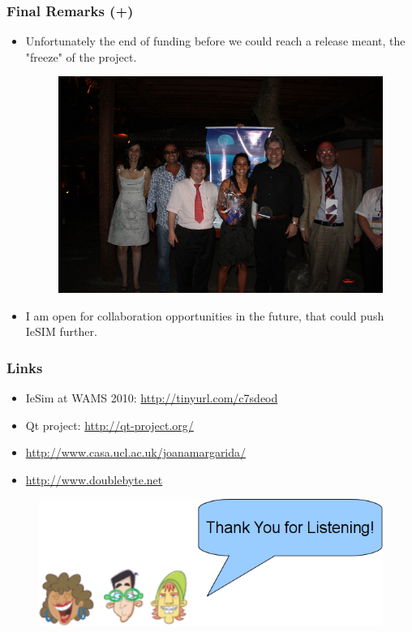 \documentclass[hyperref={pdfpagelabels=true}]{beamer}
\begin{document}
\begin{frame}
\frametitle{Final Remarks (+)}
\begin{itemize}
\item Unfortunately the end of funding before we could reach a release meant, the "freeze" of the project. %
\begin{figure}
\includegraphics[scale=0.25]{award.jpg}
\end{figure}
\item I am open for collaboration opportunities in the future, that could push IeSIM further.
\end{itemize}
\end{frame}

\begin{frame}
\frametitle{Links}
\begin{itemize}
\item IeSim at WAMS 2010: \url{http://tinyurl.com/c7sdeod}
\item Qt project: \url{http://qt-project.org/}
\item \url{http://www.casa.ucl.ac.uk/joanamargarida/}
\item \url{http://www.doublebyte.net}
\end{itemize}
\begin{figure}
\includegraphics[scale=0.4]{thanks.png}
\end{figure}
\end{frame}
\end{document}
